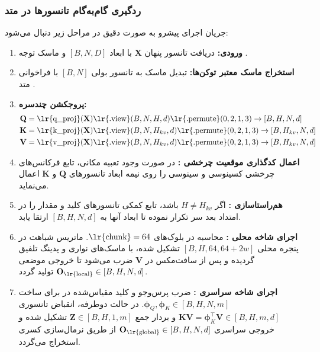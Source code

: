 \subsubsection*{ردگیری گام‌به‌گام تانسورها در متد }
جریان اجرای پیشرو به صورت دقیق در مراحل زیر دنبال می‌شود:
\begin{enumerate}
    \item \textbf{ورودی:} دریافت تانسور پنهان $\mathbf{X}$ با ابعاد $[B, N, D]$ و ماسک توجه .
    \item \textbf{استخراج ماسک معتبر توکن‌ها:} تبدیل ماسک به تانسور بولی $[B, N]$ با فراخوانی متد .
    \item \textbf{پروجکشن چندسره:}
    \begin{align*}
        \mathbf{Q} &= \text{\lr{q\_proj}}(\mathbf{X})\text{\lr{.view}}(B, N, H, d)\text{\lr{.permute}}(0, 2, 1, 3) \to [B, H, N, d] \\
        \mathbf{K} &= \text{\lr{k\_proj}}(\mathbf{X})\text{\lr{.view}}(B, N, H_{kv}, d)\text{\lr{.permute}}(0, 2, 1, 3) \to [B, H_{kv}, N, d] \\
        \mathbf{V} &= \text{\lr{v\_proj}}(\mathbf{X})\text{\lr{.view}}(B, N, H_{kv}, d)\text{\lr{.permute}}(0, 2, 1, 3) \to [B, H_{kv}, N, d]
    \end{align*}
    \item \textbf{اعمال کدگذاری موقعیت چرخشی :} در صورت وجود تعبیه مکانی، تابع  فرکانس‌های چرخشی کسینوسی و سینوسی را روی نیمه ابعاد تانسورهای $\mathbf{Q}$ و $\mathbf{K}$ اعمال می‌نماید.
    \item \textbf{هم‌راستاسازی :} اگر $H \ne H_{kv}$ باشد، تابع کمکی  تانسورهای کلید و مقدار را در امتداد بعد سر تکرار نموده تا ابعاد آنها به $[B, H, N, d]$ ارتقا یابد.
    \item \textbf{اجرای شاخه محلی :} محاسبه در بلوک‌های $\text{\lr{chunk}}=64$. ماتریس شباهت در پنجره محلی $[B, H, 64, 64 + 2w]$ تشکیل شده، با ماسک‌های نواری و پدینگ تلفیق گردیده و پس از سافت‌مکس در $\mathbf{V}$ ضرب می‌شود تا خروجی موضعی $\mathbf{O}_{\text{\lr{local}}} \in [B, H, N, d]$ تولید گردد.
    \item \textbf{اجرای شاخه سراسری :} ضرب پرس‌وجو و کلید مقیاس‌شده در  برای ساخت $\boldsymbol{\phi}_Q, \boldsymbol{\phi}_K \in [B, H, N, m]$. در حالت دوطرفه، انقباض تانسوری $\mathbf{KV} = \boldsymbol{\phi}_K^\top \mathbf{V} \in [B, H, m, d]$ و بردار جمع $\mathbf{Z} \in [B, H, 1, m]$ تشکیل شده و خروجی سراسری $\mathbf{O}_{\text{\lr{global}}} \in [B, H, N, d]$ از طریق نرمال‌سازی کسری استخراج می‌گردد.

\end{enumerate}
